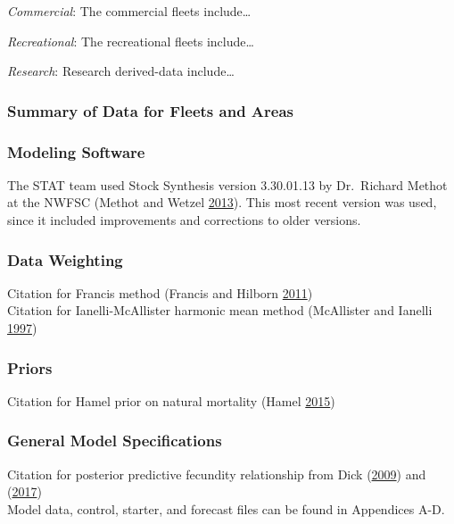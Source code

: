 \documentclass[12pt,]{article}
\begin{document}
\emph{Commercial}: The commercial fleets include\ldots{}

\emph{Recreational}: The recreational fleets include\ldots{}

\emph{Research}: Research derived-data include\ldots{}

\subsubsection{Summary of Data for Fleets and
Areas}\label{summary-of-data-for-fleets-and-areas}

\subsubsection{Modeling Software}\label{modeling-software}

The STAT team used Stock Synthesis version 3.30.01.13 by Dr.~Richard
Methot at the NWFSC (Methot and Wetzel
\protect\hyperlink{ref-methot_stock_2013}{2013}). This most recent
version was used, since it included improvements and corrections to
older versions.

\subsubsection{Data Weighting}\label{data-weighting}

Citation for Francis method (Francis and Hilborn
\protect\hyperlink{ref-francis_data_2011}{2011})\\
Citation for Ianelli-McAllister harmonic mean method (McAllister and
Ianelli \protect\hyperlink{ref-mcallister_bayesian_1997}{1997})

\subsubsection{Priors}\label{priors}

Citation for Hamel prior on natural mortality (Hamel
\protect\hyperlink{ref-hamel_method_2015}{2015})

\subsubsection{General Model
Specifications}\label{general-model-specifications}

Citation for posterior predictive fecundity relationship from Dick
(\protect\hyperlink{ref-dick_modeling_2009}{2009}) and
(\protect\hyperlink{ref-dick_meta-analysis_2017}{2017})\\
Model data, control, starter, and forecast files can be found in
Appendices A-D.
\end{document}
